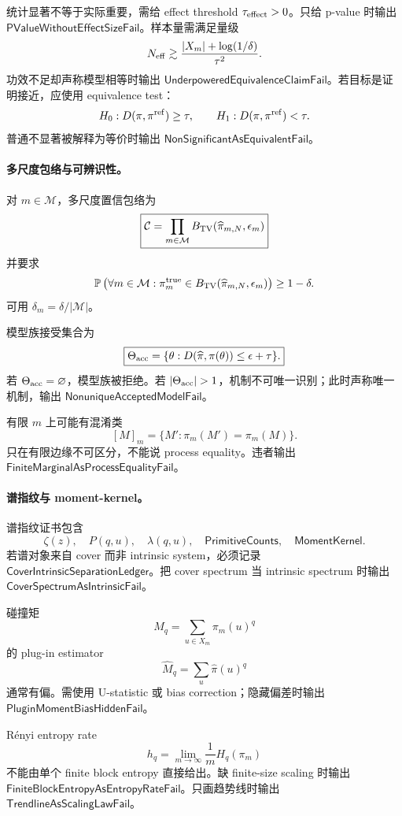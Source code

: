 统计显著不等于实际重要，需给 effect threshold \(\tau_{\rm effect}>0\)。只给 p-value 时输出 \(\mathsf{PValueWithoutEffectSizeFail}\)。样本量需满足量级
\[
N_{\rm eff}\gtrsim
\frac{|X_m|+\log(1/\delta)}{\tau^2}.
\]
功效不足却声称模型相等时输出 \(\mathsf{UnderpoweredEquivalenceClaimFail}\)。若目标是证明接近，应使用 equivalence test：
\[
H_0:D(\pi,\pi^{\rm ref})\ge\tau,
\qquad
H_1:D(\pi,\pi^{\rm ref})<\tau.
\]
普通不显著被解释为等价时输出 \(\mathsf{NonSignificantAsEquivalentFail}\)。

\paragraph{多尺度包络与可辨识性。}
对 \(m\in\mathcal M\)，多尺度置信包络为
\[
\boxed{
\mathcal C=
\prod_{m\in\mathcal M}
B_{\rm TV}(\widehat\pi_{m,N},\epsilon_m)
}
\]
并要求
\[
\mathbb P\left(
\forall m\in\mathcal M:
\pi_m^{\rm true}\in
B_{\rm TV}(\widehat\pi_{m,N},\epsilon_m)
\right)
\ge1-\delta.
\]
可用 \(\delta_m=\delta/|\mathcal M|\)。

模型族接受集合为
\[
\boxed{
\Theta_{\rm acc}
=
\{\theta:
D(\widehat\pi,\pi(\theta))
\le
\epsilon+\tau\}.
}
\]
若 \(\Theta_{\rm acc}=\varnothing\)，模型族被拒绝。若 \(|\Theta_{\rm acc}|>1\)，机制不可唯一识别；此时声称唯一机制，输出 \(\mathsf{NonuniqueAcceptedModelFail}\)。

有限 \(m\) 上可能有混淆类
\[
\boxed{
[M]_m=\{M':\pi_m(M')=\pi_m(M)\}.
}
\]
只在有限边缘不可区分，不能说 process equality。违者输出 \(\mathsf{FiniteMarginalAsProcessEqualityFail}\)。

\paragraph{谱指纹与 moment-kernel。}
谱指纹证书包含
\[
\zeta(z),\quad P(q,u),\quad \lambda(q,u),\quad
\mathsf{PrimitiveCounts},\quad
\mathsf{MomentKernel}.
\]
若谱对象来自 cover 而非 intrinsic system，必须记录 \(\mathsf{CoverIntrinsicSeparationLedger}\)。把 cover spectrum 当 intrinsic spectrum 时输出 \(\mathsf{CoverSpectrumAsIntrinsicFail}\)。

碰撞矩
\[
M_q=\sum_{u\in X_m}\pi_m(u)^q
\]
的 plug-in estimator
\[
\widehat M_q=\sum_u\widehat\pi(u)^q
\]
通常有偏。需使用 U-statistic 或 bias correction；隐藏偏差时输出 \(\mathsf{PluginMomentBiasHiddenFail}\)。

Rényi entropy rate
\[
h_q=\lim_{m\to\infty}\frac1mH_q(\pi_m)
\]
不能由单个 finite block entropy 直接给出。缺 finite-size scaling 时输出 \(\mathsf{FiniteBlockEntropyAsEntropyRateFail}\)。只画趋势线时输出 \(\mathsf{TrendlineAsScalingLawFail}\)。

